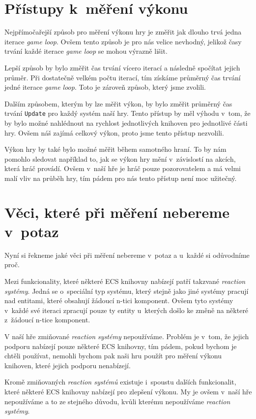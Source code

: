 \section{Přístupy k~měření výkonu}
\label{sec:performance-measurements}
Nejpřímočařejší způsob pro měření výkonu hry je změřit jak dlouho trvá jedna iterace \textit{game loop}. Ovšem tento způsob je pro nás velice nevhodný, jelikož časy trvání každé iterace \textit{game loop} se mohou výrazně lišit.

Lepší způsob by bylo změřit čas trvání vícero iterací a následně spočítat jejich průměr. Při dostatečně velkém počtu iterací, tím získáme průměrný čas trvání jedné iterace \textit{game loop}. Toto je zároveň způsob, který jsme zvolili.

Dalším způsobem, kterým by lze měřit výkon, by bylo změřit průměrný čas trvání \texttt{Update} pro každý systém naší hry. Tento přístup by měl výhodu v~tom, že by bylo možné nahlédnout na rychlost jednotlivých knihoven pro jednotlivé části hry. Ovšem náš zajímá celkový výkon, proto jsme tento přístup nezvolili.

Výkon hry by také bylo možné měřit během samotného hraní. To by nám pomohlo sledovat například to, jak se výkon hry mění v~závislostí na akcích, která hráč provádí. Ovšem v~naší hře je hráč pouze pozorovatelem a má velmi malí vliv na průběh hry, tím pádem pro nás tento přístup není moc užitečný.

\section{Věci, které při měření nebereme v~potaz}
Nyní si řekneme jaké věci při měření nebereme v~potaz a u~každé si odůvodníme proč.

Mezi funkcionality, které některé ECS knihovny nabízejí patří takzvané \textit{reaction systémy}. Jedná se o~speciální typ systému, který stejně jako jiné systémy pracují nad entitami, které obsahují žádoucí n-tici komponent. Ovšem tyto systémy v~každé své iteraci zpracují pouze ty entity u~kterých došlo ke změně na některé z~žádoucí n-tice komponent.

V naší hře zmiňované \textit{reaction systémy} nepoužíváme. Problém je v~tom, že jejich podporu nabízejí pouze některé ECS knihovny, tím pádem, pokud bychom je chtěli používat, nemohli bychom pak naši hru použít pro měření výkonu knihoven, které jejich podporu nenabízejí.

Kromě zmiňovaných \textit{reaction systémů} existuje i~spoustu dalších funkcionalit, které některé ECS knihovny nabízejí pro zlepšení výkonu. My je ovšem v~naší hře nepoužíváme a to ze stejného důvodu, kvůli kterému nepoužíváme \textit{reaction systémy}.














